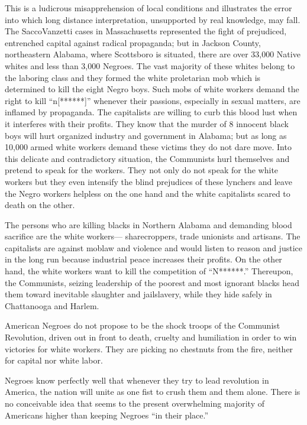 \documentclass[letterpaper,10pt,english]{jupyterBook}
\begin{document}
\sphinxAtStartPar
This is a ludicrous misapprehension of local conditions and illustrates the error into which long distance interpretation, unsupported by real knowledge, may fall. The Sacco\sphinxhyphen{}Vanzetti cases in Massachusetts represented the fight of prejudiced, entrenched capital against radical propaganda; but in Jackson County, northeastern Alabama, where Scottsboro is situated, there are over 33,000 Native whites and less than 3,000 Negroes. The vast majority of these whites belong to the laboring class and they formed the white proletarian mob which is determined to kill the eight Negro boys. Such mobs of white workers demand the right to kill “n{[}******{]}” whenever their passions, especially in sexual matters, are inflamed by propaganda. The capitalists are willing to curb this blood lust when it interferes with their profits. They know that the murder of 8 innocent black boys will hurt organized industry and government in Alabama; but as long as 10,000 armed white workers demand these victims they do not dare move. Into this delicate and contradictory situation, the Communists hurl themselves and pretend to speak for the workers. They not only do not speak for the white workers but they even intensify the blind prejudices of these lynchers and leave the Negro workers helpless on the one hand and the white capitalists scared to death on the other.

\sphinxAtStartPar
The persons who are killing blacks in Northern Alabama and demanding blood sacrifice are the white workers— sharecroppers, trade unionists and artisans. The capitalists are against mob\sphinxhyphen{}law and violence and would listen to reason and justice in the long run because industrial peace increases their profits. On the other hand, the white workers want to kill the competition of “N******.” Thereupon, the Communists, seizing leadership of the poorest and most ignorant blacks head them toward inevitable slaughter and jail\sphinxhyphen{}slavery, while they hide safely in Chattanooga and Harlem.

\sphinxAtStartPar
American Negroes do not propose to be the shock troops of the Communist Revolution, driven out in front to death, cruelty and humiliation in order to win victories for white workers. They are picking no chestnuts from the fire, neither for capital nor white labor.

\sphinxAtStartPar
Negroes know perfectly well that whenever they try to lead revolution in America, the nation will unite as one fist to crush them and them alone. There is no conceivable idea that seems to the present overwhelming majority of Americans higher than keeping Negroes “in their place.”
\end{document}
